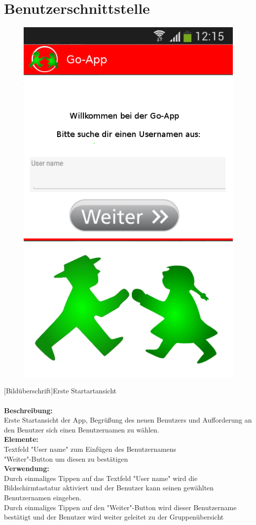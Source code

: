 \section{Benutzerschnittstelle}
\begin{figure} 
\includegraphics[scale =1]{resources/images/startansicht.png}
\end{figure}
[Bildüberschrift]Erste Startartansicht\\ \\
\textbf{Beschreibung:}\\
Erste Startansicht der App, Begrüßung des neuen Benutzers und Aufforderung an den Benutzer sich einen Benutzernamen zu wählen.\\
\textbf{Elemente:}\\
Textfeld "User name" zum Einfügen des Benutzernamens\\
"Weiter"-Button um diesen zu bestätigen\\
\textbf{Verwendung:}\\
Durch einmaliges Tippen auf das Textfeld "User name" wird die Bildschirmtastatur aktiviert und der Benutzer kann seinen gewählten Benutzernamen eingeben.\\
Durch einmaliges Tippen auf den "Weiter"-Button wird dieser Benutzername bestätigt und der Benutzer wird weiter geleitet zu der Gruppenübersicht\\ \\

